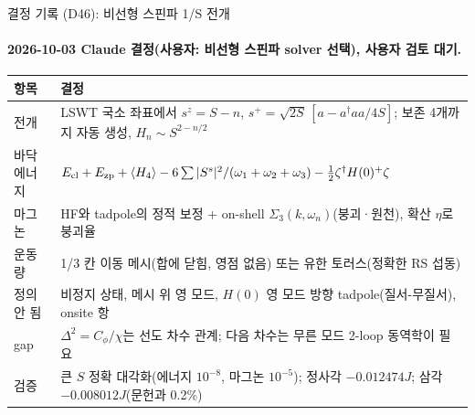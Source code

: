 \begin{frame}[label=decisions-d46-nlswt]{결정 기록 (D46): 비선형 스핀파 1/S 전개}
  \framesubtitle{2026-10-03 Claude 결정(사용자: 비선형 스핀파 solver 선택), 사용자 검토 대기.}
  \small\renewcommand{\arraystretch}{1.12}
  \begin{tabularx}{\textwidth}{@{}P{3.0cm}Y@{}}
    \toprule
    항목 & 결정 \\
    \midrule
    전개 & LSWT 국소 좌표에서 $s^z=S-n$, $s^+=\sqrt{2S}\,[a-a^\dagger aa/4S]$; 보존 4개까지 자동 생성, $H_n\sim S^{2-n/2}$ \\
    바닥 에너지 & $E_{\rm cl}+E_{\rm zp}+\langle H_4\rangle-6\sum|S^s|^2/(\omega_1+\omega_2+\omega_3)-\tfrac12\zeta^\dagger H(0)^+\zeta$ \\
    마그논 & HF와 tadpole의 정적 보정 + on-shell $\Sigma_3(k,\omega_n)$(붕괴·원천), 확산 $\eta$로 붕괴율 \\
    운동량 & 1/3 칸 이동 메시(합에 닫힘, 영점 없음) 또는 유한 토러스(정확한 RS 섭동) \\
    정의 안 됨 & 비정지 상태, 메시 위 영 모드, $H(0)$ 영 모드 방향 tadpole(질서-무질서), onsite 항 \\
    gap & $\Delta^2=C_\phi/\chi$는 선도 차수 관계; 다음 차수는 무른 모드 2-loop 동역학이 필요 \\
    검증 & 큰 $S$ 정확 대각화(에너지 $10^{-8}$, 마그논 $10^{-5}$); 정사각 $-0.012474J$; 삼각 $-0.008012J$(문헌과 0.2\%) \\
    \bottomrule
  \end{tabularx}
\end{frame}

